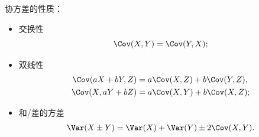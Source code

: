 \begin{corollary}
	协方差的性质：
	\begin{itemize}
		\item 交换性
		\begin{equation}
			\Cov(X,Y)=\Cov(Y,X);
		\end{equation}
		\item 双线性
		\begin{subequations}
			\begin{align}
				\Cov(aX+bY,Z)&=a\Cov(X,Z)+b\Cov(Y,Z),\\
				\Cov(X,aY+bZ)&=a\Cov(X,Y)+b\Cov(X,Z);
			\end{align}
		\end{subequations}
		\item 和/差的方差
		\begin{equation}
			\Var(X\pm Y)=\Var(X)+\Var(Y)\pm 2\Cov(X,Y).
		\end{equation}
	\end{itemize}
\end{corollary}

